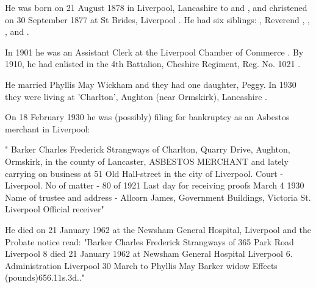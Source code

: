 
He was born on 21 August 1878 in	Liverpool, Lancashire to  and , and christened on 30 September 1877 at St Brides, Liverpool \cite{CFSBarkerBaptism}. He had six siblings: , Reverend , , ,  and .

In 1901 he was an Assistant Clerk at the Liverpool  Chamber of Commerce \cite{CFSBarkerOccupation}.  By 1910, he had enlisted in the  4th Battalion, Cheshire Regiment, Reg. No. 1021 \cite{CFSBarkerMilitary}.

He married Phyllis May Wickham and they had one daughter, Peggy. In 1930 they were living at 'Charlton', Aughton (near Ormskirk), Lancashire \cite{CFSBarker1930}.

On 18 February 1930 he was (possibly) filing for bankruptcy as an Asbestos merchant in Liverpool:

" Barker Charles Frederick Strangways of Charlton, Quarry Drive, Aughton, Ormskirk, in the county of Lancaster, ASBESTOS MERCHANT and lately carrying on business at 51 Old Hall-street in the city of Liverpool.
Court - Liverpool.
No of matter - 80 of 1921
Last day for receiving proofs March 4 1930
Name of trustee and address - Allcorn James, Government Buildings, Victoria St. Liverpool Official receiver" \cite{CFSBarker1930}


He died on 21 January 1962 at the Newsham General Hospital, Liverpool \cite{CFSBarkerDeath} and the Probate notice read:    
"Barker Charles Frederick Strangways of 365 Park Road Liverpool 8 died 21 January 1962 at Newsham General Hospital Liverpool 6. Administration Liverpool 30 March to Phyllis May Barker widow Effects (pounds)656.11s.3d.."
